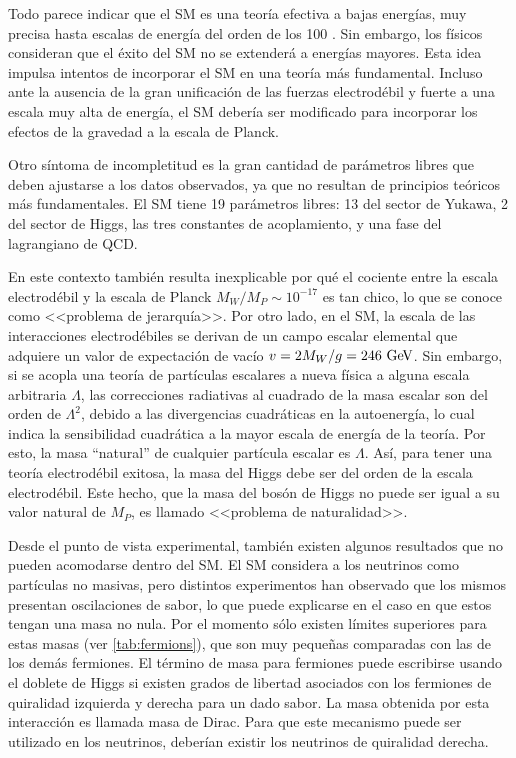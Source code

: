 Todo parece indicar que el SM es una teoría efectiva a bajas energías, muy
precisa hasta escalas de energía del orden de los 100 {\gev}. Sin embargo, los
físicos consideran que el éxito del SM no se extenderá a energías mayores. Esta
idea impulsa intentos de incorporar el SM en una teoría más fundamental. Incluso
ante la ausencia de la gran unificación de las fuerzas electrodébil y fuerte a
una escala muy alta de energía, el SM debería ser modificado para incorporar los
efectos de la gravedad a la escala de Planck.

Otro síntoma de incompletitud es la gran cantidad de parámetros libres que deben
ajustarse a los datos observados, ya que no resultan de principios teóricos más
fundamentales. El SM tiene 19 parámetros libres: 13 del sector de Yukawa, 2 del
sector de Higgs, las tres constantes de acoplamiento, y una fase del lagrangiano
de QCD.


En este contexto también resulta inexplicable por qué el cociente entre la escala
electrodébil y la escala de Planck $M_W/M_P \sim 10^{-17}$ es tan chico, lo que
se conoce como <<problema de jerarquía>>.
Por otro lado, en el SM, la escala de las interacciones electrodébiles se derivan de un
campo escalar elemental que adquiere un valor de expectación de vacío $v = 2
M_W /g = 246 \gev$. Sin embargo, si se acopla una teoría de partículas
escalares a nueva física a alguna escala arbitraria $\Lambda$, las correcciones
radiativas al cuadrado de la masa escalar son del orden de $\Lambda^2$, debido a
las divergencias cuadráticas en la autoenergía, lo cual indica la sensibilidad
cuadrática a la mayor escala de energía de la teoría. Por esto, la masa
``natural'' de cualquier partícula escalar es $\Lambda$. Así, para tener una teoría
electrodébil exitosa, la masa del Higgs debe ser del orden de la escala
electrodébil. Este hecho, que la masa del bosón de Higgs no puede ser igual a su
valor natural de $M_P$, es llamado <<problema de naturalidad>>.

Desde el punto de vista experimental, también existen algunos resultados que no
pueden acomodarse dentro del SM. El SM considera a los neutrinos como partículas
no masivas, pero distintos
experimentos\cite{PhysRevLett.101.111301,PhysRevD.78.032002} han observado que
los mismos presentan oscilaciones de sabor, lo que puede explicarse en el caso
en que estos tengan una masa no nula. Por el momento sólo existen límites
superiores para estas masas (ver \cref{tab:fermions}), que son muy peque\~nas
comparadas con las de los demás fermiones. El término de masa para fermiones
puede escribirse usando el doblete de Higgs si existen grados de libertad
asociados con los fermiones de quiralidad izquierda y derecha para un dado
sabor. La masa obtenida por esta interacción es llamada masa de Dirac. Para que
este mecanismo puede ser utilizado en los neutrinos, deberían existir los
neutrinos de quiralidad derecha.

